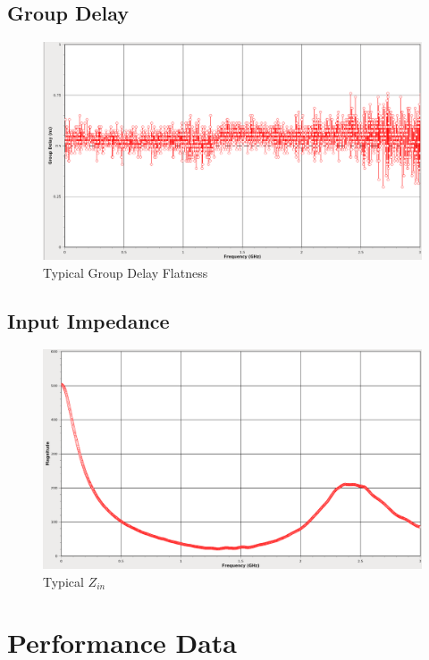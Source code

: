 \documentclass[11pt]{article}
\begin{document}
\subsection{Group Delay}

\begin{figure}[h]
\centering
\includegraphics[width=14cm]{typical-groupdelay.png}
\caption{Typical Group Delay Flatness}
\label{typical-groupdelay}
\end{figure}
\FloatBarrier

\pagebreak
\subsection{Input Impedance}

\begin{figure}[h!]
\centering
\includegraphics[width=14cm]{typical-zin.png}
\caption{Typical $Z_{in}$}
\label{typical-zin}
\end{figure}

\FloatBarrier

\pagebreak
\section{Performance Data}
\end{document}
